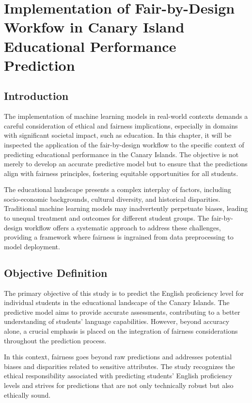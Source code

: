 \documentclass[12pt,a4paper,openright,twoside]{book}
\begin{document}
\chapter{Implementation of Fair-by-Design Workfow in Canary Island Educational Performance Prediction}
\label{chap:real-world-scenario}

\section{Introduction}

The implementation of machine learning models in real-world contexts demands a careful consideration of ethical and fairness implications, especially in domains with significant societal impact, such as education. In this chapter, it will be inspected the application of the fair-by-design workflow to the specific context of predicting educational performance in the Canary Islands. The objective is not merely to develop an accurate predictive model but to ensure that the predictions align with fairness principles, fostering equitable opportunities for all students.

The educational landscape presents a complex interplay of factors, including socio-economic backgrounds, cultural diversity, and historical disparities. Traditional machine learning models may inadvertently perpetuate biases, leading to unequal treatment and outcomes for different student groups. The fair-by-design workflow offers a systematic approach to address these challenges, providing a framework where fairness is ingrained from data preprocessing to model deployment.

\section{Objective Definition}

The primary objective of this study is to predict the English proficiency level for individual students in the educational landscape of the Canary Islands. The predictive model aims to provide accurate assessments, contributing to a better understanding of students' language capabilities. However, beyond accuracy alone, a crucial emphasis is placed on the integration of fairness considerations throughout the prediction process.

In this context, fairness goes beyond raw predictions and addresses potential biases and disparities related to sensitive attributes. The study recognizes the ethical responsibility associated with predicting students' English proficiency levels and strives for predictions that are not only technically robust but also ethically sound.
\end{document}
